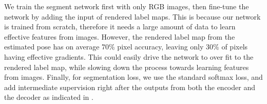 We train the segment network first with only RGB images, then fine-tune the network by adding the input of rendered label maps. This is because our network is trained from scratch, therefore it needs a large amount of data to learn effective features from images. However, the rendered label map from the estimated pose has on average 70$\%$ pixel accuracy, leaving only 30$\%$ of pixels having effective gradients. This could easily drive the network to over fit to the rendered label map, while slowing down the process towards learning features from images. Finally, for segmentation loss, we use the standard softmax loss, and add intermediate supervision right after the outputs from both the encoder and the decoder as indicated in . 

